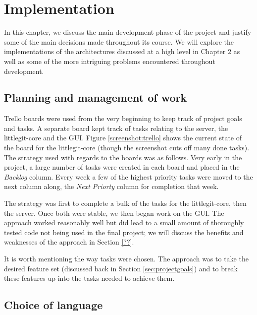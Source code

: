 \chapter{Implementation}

In this chapter, we discuss the main development phase of the project and justify some of the main decisions made throughout its course. We will explore the implementations of the architectures discussed at a high level in Chapter 2 as well as some of the more intriguing problems encountered throughout development.


\section{Planning and management of work}

Trello boards were used from the very beginning to keep track of project goals and tasks. A separate board kept track of tasks relating to the server, the littlegit-core and the GUI. Figure \ref{screenshot:trello} shows the current state of the board for the littlegit-core (though the screenshot cuts off many done tasks). The strategy used with regards to the boards was as follows. Very early in the project, a large number of tasks were created in each board and placed in the \emph{Backlog} column. Every week a few of the highest priority tasks were moved to the next column along, the \emph{Next Priorty} column for completion that week. 


The strategy was first to complete a bulk of the tasks for the littlegit-core, then the server. Once both were stable, we then began work on the GUI. The approach worked reasonably well but did lead to a small amount of thoroughly tested code not being used in the final project; we will discuss the benefits and weaknesses of the approach in Section \ref{??}.

It is worth mentioning the way tasks were chosen. The approach was to take the desired feature set (discussed back in Section \ref{sec:projectgoals}) and to break these features up into the tasks needed to achieve them. 

\section{Choice of language}

